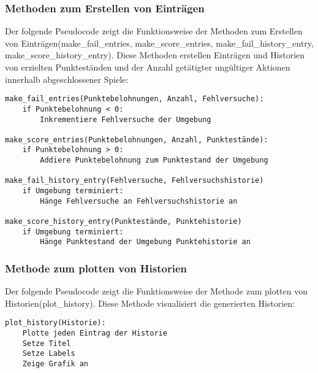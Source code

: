 \subsubsection{Methoden zum Erstellen von Einträgen}
\begin{minipage}{\linewidth}
Der folgende Pseudocode zeigt die Funktionsweise der Methoden zum Erstellen von Einträgen(make\_fail\_entries, make\_score\_entries, make\_fail\_history\_entry, make\_score\_history\_entry). Diese Methoden erstellen Einträgen und Historien von erzielten Punkteständen und der Anzahl getätigter ungültiger Aktionen innerhalb abgeschlossener Spiele:
\vspace{0.5cm}
\begin{lstlisting}[caption={Methoden zum Erstellen von Einträgen}]
make_fail_entries(Punktebelohnungen, Anzahl, Fehlversuche):
	if Punktebelohnung < 0:
		Inkrementiere Fehlversuche der Umgebung

make_score_entries(Punktebelohnungen, Anzahl, Punktestände):
	if Punktebelohnung > 0:
		Addiere Punktebelohnung zum Punktestand der Umgebung

make_fail_history_entry(Fehlversuche, Fehlversuchshistorie)
	if Umgebung terminiert:
		Hänge Fehlversuche an Fehlversuchshistorie an
		
make_score_history_entry(Punktestände, Punktehistorie)
	if Umgebung terminiert:
		Hänge Punktestand der Umgebung Punktehistorie an
\end{lstlisting}
\end{minipage}
\subsubsection{Methode zum plotten von Historien}
\begin{minipage}{\linewidth}
Der folgende Pseudocode zeigt die Funktionsweise der Methode zum plotten von Historien(plot\_history). Diese Methode visualisiert die generierten Historien:
\vspace{0.5cm}
\begin{lstlisting}[caption={Methode zum plotten von Historien}]
plot_history(Historie):
	Plotte jeden Eintrag der Historie
	Setze Titel
	Setze Labels
	Zeige Grafik an
\end{lstlisting}
\end{minipage}
